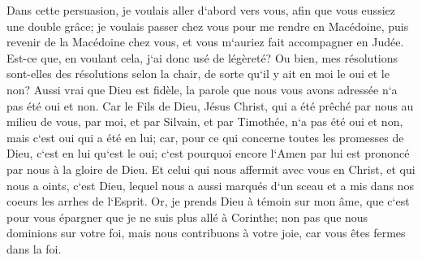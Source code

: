 \verse Dans cette persuasion, je voulais aller d`abord vers vous, afin que vous eussiez une double grâce; 
\verse je voulais passer chez vous pour me rendre en Macédoine, puis revenir de la Macédoine chez vous, et vous m`auriez fait accompagner en Judée. 
\verse Est-ce que, en voulant cela, j`ai donc usé de légèreté? Ou bien, mes résolutions sont-elles des résolutions selon la chair, de sorte qu`il y ait en moi le oui et le non? 
\verse Aussi vrai que Dieu est fidèle, la parole que nous vous avons adressée n`a pas été oui et non. 
\verse Car le Fils de Dieu, Jésus Christ, qui a été prêché par nous au milieu de vous, par moi, et par Silvain, et par Timothée, n`a pas été oui et non, mais c`est oui qui a été en lui; 
\verse car, pour ce qui concerne toutes les promesses de Dieu, c`est en lui qu`est le oui; c`est pourquoi encore l`Amen par lui est prononcé par nous à la gloire de Dieu. 
\verse Et celui qui nous affermit avec vous en Christ, et qui nous a oints, c`est Dieu, 
\verse lequel nous a aussi marqués d`un sceau et a mis dans nos coeurs les arrhes de l`Esprit. 
\verse Or, je prends Dieu à témoin sur mon âme, que c`est pour vous épargner que je ne suis plus allé à Corinthe; 
\verse non pas que nous dominions sur votre foi, mais nous contribuons à votre joie, car vous êtes fermes dans la foi. 

